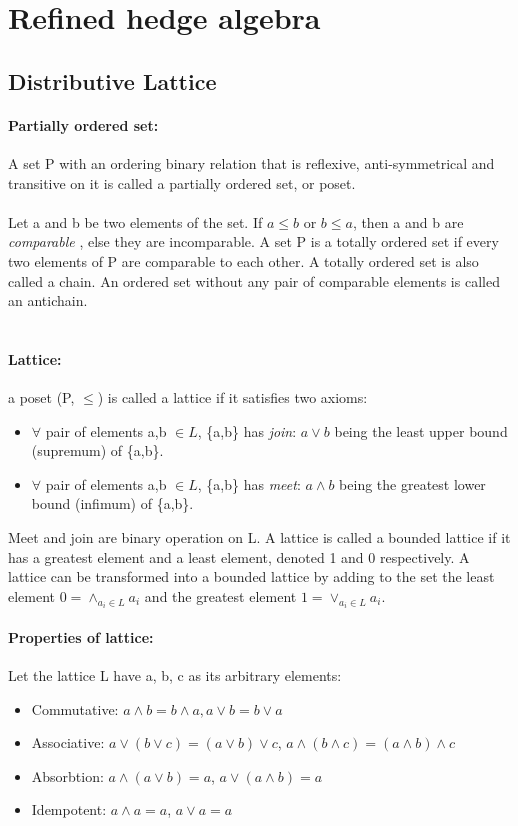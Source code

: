\documentclass[26pt,fleqn,]{article}
\begin{document}
\section{Refined hedge algebra}
\subsection{Distributive Lattice}
\paragraph{Partially ordered set: } A set P with an ordering binary relation that is reflexive, 
anti-symmetrical and transitive on it is called a partially ordered set, or poset.\\\\
Let a and b be two elements of the set. If \(a \le b\) or \(b \le a\), then a and b are {\em comparable}
, else they are incomparable. A set P is a totally ordered set if every two elements of P are comparable
to each other. A totally ordered set is also called a chain. An ordered set without any pair of 
comparable elements is called an antichain.\\\\
\paragraph{Lattice: } a poset (P, \(\le\)) is called a lattice if it satisfies two axioms:
\begin{itemize}
	\item \(\forall\) pair of elements a,b \(\in L\), \{a,b\} has {\em join}: \(a \vee b\) being the
		least upper bound (supremum) of \{a,b\}.
	\item \(\forall\) pair of elements a,b \(\in L\), \{a,b\} has {\em meet}: \(a \wedge b\) being 
		the greatest lower bound (infimum) of \{a,b\}.
\end{itemize}

Meet and join are binary operation on L. A lattice is called a bounded lattice if it has a greatest 
element and a least element, denoted 1 and 0 respectively. A lattice can be transformed into a bounded
lattice by adding to the set the least element \(0 = \wedge_{a_i \in L} a_i\) and the greatest element
\(1 = \vee_{a_i \in L} a_i\).
\paragraph{Properties of lattice: } Let the lattice L have a, b, c as its arbitrary elements:
\begin{itemize}
	\item Commutative: \(a \wedge b = b \wedge a, a \vee b = b \vee a\)
	\item Associative: \(a \vee (b \vee c) = (a \vee b) \vee c \), 
			\(a \wedge (b \wedge c) = (a \wedge b) \wedge c \)
	\item Absorbtion: \(a \wedge (a \vee b) = a\), \(a \vee (a \wedge b) = a\)
	\item Idempotent: \(a \wedge a = a\), \(a \vee a = a\)
\end{itemize}
\end{document}
